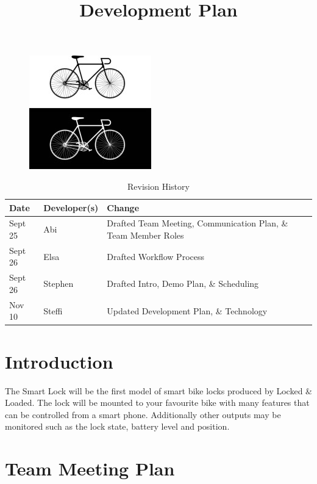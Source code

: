 \documentclass{article}
\title{Development Plan\\\progname}
\author{\authname}
\date{}
\begin{document}
\maketitle
\begin{figure}[h!]
  \centering
  \includegraphics[width=0.4\linewidth]{../BikeLogo.jpg}
\end{figure}

\begin{table}[hp]
\caption{Revision History} \label{TblRevisionHistory}
\begin{tabularx}{\textwidth}{llX}
\toprule
\textbf{Date} & \textbf{Developer(s)} & \textbf{Change}\\
\midrule
Sept 25 & Abi & Drafted Team Meeting, Communication Plan, \& Team Member Roles\\
Sept 26 & Elsa & Drafted Workflow Process\\
Sept 26 & Stephen & Drafted Intro, Demo Plan, \& Scheduling\\
Nov 10 & Steffi & Updated Development Plan, \& Technology\\
\bottomrule

\end{tabularx}
\end{table}

\newpage



\section{Introduction}

The Smart Lock will be the first model of smart bike locks produced by Locked \& Loaded. The lock will be mounted to your favourite bike with many features that can be controlled from a smart phone. Additionally other outputs may be monitored such as the lock state, battery level and position.

\section{Team Meeting Plan}
\end{document}
